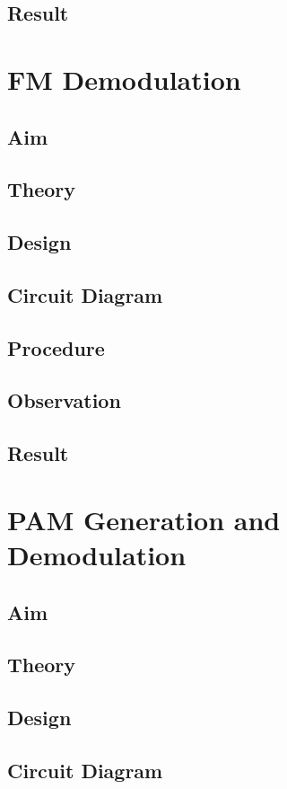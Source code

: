 \documentclass{book}
\begin{document}
\section*{Result}
\chapter[FM Demodulation]{FM Demodulation}
\section*{Aim}
\section*{Theory}
\section*{Design}
\section*{Circuit Diagram}
\section*{Procedure}
\section*{Observation}
\section*{Result}

\chapter[PAM Generation and Demodulation]{PAM Generation and Demodulation}
\section*{Aim}
\section*{Theory}
\section*{Design}
\section*{Circuit Diagram}
\end{document}
